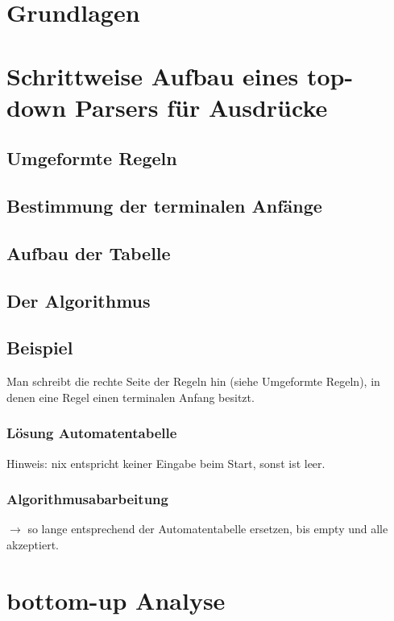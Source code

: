 \section{Grundlagen}
\section{Schrittweise Aufbau eines top-down Parsers für Ausdrücke}
\subsection{Umgeformte Regeln}
\subsection{Bestimmung der terminalen Anfänge}
\subsection{Aufbau der Tabelle}
\subsection{Der Algorithmus}

\subsection{Beispiel}
Man schreibt die rechte Seite der Regeln hin (siehe Umgeformte Regeln), in denen eine Regel einen terminalen Anfang besitzt.
\subsubsection*{Lösung Automatentabelle}
Hinweis: nix entspricht keiner Eingabe beim Start, sonst ist leer.
\subsubsection*{Algorithmusabarbeitung}
$\to$ so lange entsprechend der Automatentabelle ersetzen, bis empty und alle akzeptiert.

\section{bottom-up Analyse}
